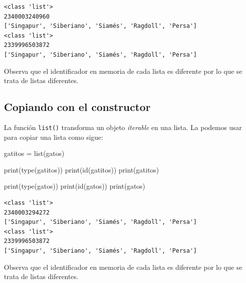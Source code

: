 \documentclass[
  spanish,
  letterpaper,
]{scrbook}
\newenvironment{Shaded}{\begin{snugshade}}{\end{snugshade}}
\newcommand{\BuiltInTok}[1]{\textcolor[rgb]{0.00,0.23,0.31}{#1}}
\newcommand{\NormalTok}[1]{\textcolor[rgb]{0.00,0.23,0.31}{#1}}
\newcommand{\OperatorTok}[1]{\textcolor[rgb]{0.37,0.37,0.37}{#1}}
\theoremstyle{definition}
\theoremstyle{remark}
\begin{document}
\begin{verbatim}
<class 'list'>
2340003240960
['Singapur', 'Siberiano', 'Siamés', 'Ragdoll', 'Persa']
<class 'list'>
2339996503872
['Singapur', 'Siberiano', 'Siamés', 'Ragdoll', 'Persa']
\end{verbatim}

Observa que el identificador en memoria de cada lista es diferente por
lo que se trata de listas diferentes.

\subsection{Copiando con el
constructor}\label{copiando-con-el-constructor}

La función \texttt{list()} transforma un objeto \emph{iterable} en una
lista. La podemos usar para copiar una lista como sigue:

\begin{Shaded}
\begin{Highlighting}[]
\NormalTok{gatitos }\OperatorTok{=} \BuiltInTok{list}\NormalTok{(gatos)}
\end{Highlighting}
\end{Shaded}

\begin{Shaded}
\begin{Highlighting}[]
\BuiltInTok{print}\NormalTok{(}\BuiltInTok{type}\NormalTok{(gatitos))}
\BuiltInTok{print}\NormalTok{(}\BuiltInTok{id}\NormalTok{(gatitos))}
\BuiltInTok{print}\NormalTok{(gatitos)}

\BuiltInTok{print}\NormalTok{(}\BuiltInTok{type}\NormalTok{(gatos))}
\BuiltInTok{print}\NormalTok{(}\BuiltInTok{id}\NormalTok{(gatos))}
\BuiltInTok{print}\NormalTok{(gatos)}
\end{Highlighting}
\end{Shaded}

\begin{verbatim}
<class 'list'>
2340003294272
['Singapur', 'Siberiano', 'Siamés', 'Ragdoll', 'Persa']
<class 'list'>
2339996503872
['Singapur', 'Siberiano', 'Siamés', 'Ragdoll', 'Persa']
\end{verbatim}

Observa que el identificador en memoria de cada lista es diferente por
lo que se trata de listas diferentes.
\end{document}
